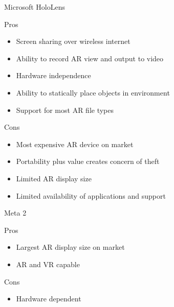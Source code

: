     \begin{description}
        \item Microsoft HoloLens
            \begin{description} 
                \item Pros
                \begin{itemize}
                    \item Screen sharing over wireless internet  
                    \item Ability to record AR view and output to video
                    \item Hardware independence
                    \item Ability to statically place objects in environment
                    \item Support for most AR file types
                \end{itemize}
            \end{description}
            \begin{description} 
                \item Cons
                \begin{itemize}
                    \item Most expensive AR device on market
                    \item Portability plus value creates concern of theft
                    \item Limited AR display size
                    \item Limited availability of applications and support
                \end{itemize}
            \end{description}
        \item Meta 2
            \begin{description} 
            \item Pros
            \begin{itemize}
                \item Largest AR display size on market
                \item AR and VR capable
            \end{itemize}
        \end{description}
        \begin{description} 
            \item Cons
            \begin{itemize}
                \item Hardware dependent

\end{itemize}
\end{description}
\end{description}
